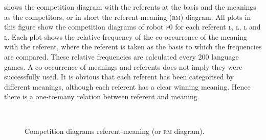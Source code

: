  shows the competition diagram with the referents at the basis and the meanings as the competitors, or in short the referent-meaning {\scshape (rm)} diagram. All plots in this figure show the competition diagrams of robot $r0$ for each referent \textsc{l}, \textsc{l}, \textsc{l} and \textsc{l}. Each plot shows the relative frequency of the co-occurrence of the meaning with the referent, where the referent is taken as the basis to which the frequencies are compared. These relative frequencies are calculated every 200 language games. A co-occurrence of meanings and referents does not imply they were successfully used. It is obvious that each referent has been categorised by different meanings, although each referent has a clear winning meaning. Hence there is a one-to-many relation between referent and meaning.

\begin{figure}[t]
\centering
{}
\\
\caption{Competition diagrams referent-meaning (or {\scshape rm} diagram).}
\label{f:st:compRC}
\end{figure}


